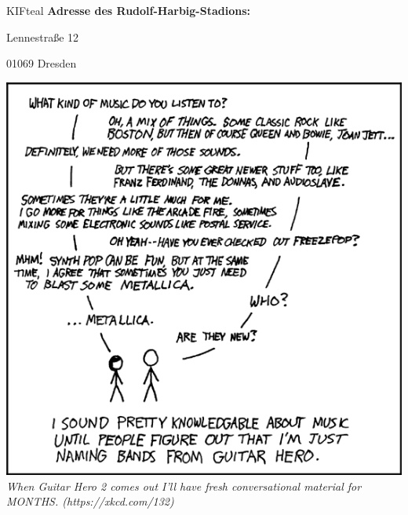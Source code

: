 \begin{awesomeblock}[KIFteal]{2pt}{\faQuestion}{KIFteal}
    \textbf{Adresse des Rudolf-Harbig-Stadions:}

    Lennestraße 12

    01069 Dresden
\end{awesomeblock}

\vspace{-10pt}
\begin{center}
\includegraphics[width=.8\textwidth,keepaspectratio]{img/xkcd/music_knowledge.png}\\
    {\footnotesize \textit{When Guitar Hero 2 comes out I'll have fresh conversational material for MONTHS. (https://xkcd.com/132)}}
\end{center}

